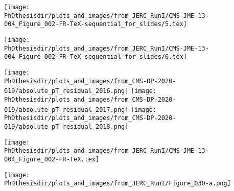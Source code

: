 \begin{frame}[t]
\addtocounter{framenumber}{-1}
\large
\texttt{[image: \\PhDthesisdir/plots\_and\_images/from\_JERC\_RunI/CMS-JME-13-004\_Figure\_002-FR-TeX-sequential\_for\_slides/5.tex]}
\end{frame}

\begin{frame}[t]
\addtocounter{framenumber}{-1}
\large
\texttt{[image: \\PhDthesisdir/plots\_and\_images/from\_JERC\_RunI/CMS-JME-13-004\_Figure\_002-FR-TeX-sequential\_for\_slides/6.tex]}

\vfill

\texttt{[image: \\PhDthesisdir/plots\_and\_images/from\_CMS-DP-2020-019/absolute\_pT\_residual\_2016.png]}
\hfill
\texttt{[image: \\PhDthesisdir/plots\_and\_images/from\_CMS-DP-2020-019/absolute\_pT\_residual\_2017.png]}
\hfill
\texttt{[image: \\PhDthesisdir/plots\_and\_images/from\_CMS-DP-2020-019/absolute\_pT\_residual\_2018.png]}
\end{frame}

\begin{frame}[t]
\addtocounter{framenumber}{-1}
\large
\texttt{[image: \\PhDthesisdir/plots\_and\_images/from\_JERC\_RunI/CMS-JME-13-004\_Figure\_002-FR-TeX.tex]}

\vfill

\begin{center}
\texttt{[image: \\PhDthesisdir/plots\_and\_images/from\_JERC\_RunI/Figure\_030-a.png]}
\end{center}
\end{frame}

